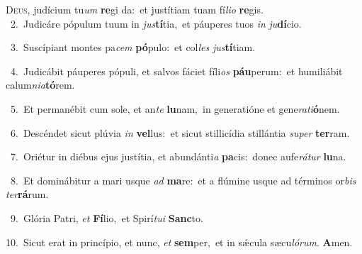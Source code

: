 \lettrine{\initial\textcolor{\initialcolor}{D}}{eus,} judícium tu\textit{um} \textbf{re}\-gi da:~\star et justítiam tuam fí\-\textit{li}\-\textit{o} \textbf{re}\-gis.\\
{\numbfont\textcolor{\numbcolor}{~2.}}~Judicáre pópulum tuum in \textit{jus}\-\textbf{tí}tia,~\star et páuperes tuos \textit{in} \textit{ju}\-\textbf{dí}cio.\par
{\numbfont\textcolor{\numbcolor}{~3.}}~Suscípiant montes pa\textit{cem} \textbf{pó}\-pulo:~\star et col\textit{les} \textit{jus}\-\textbf{tí}tiam.\par
{\numbfont\textcolor{\numbcolor}{~4.}}~Judicábit páuperes pópuli, et salvos fáciet fíli\textit{os} \textbf{páu}\-perum:~\star et humiliábit calum\-\textit{ni}\-\textit{a}\textbf{tó}rem.\par
{\numbfont\textcolor{\numbcolor}{~5.}}~Et permanébit cum sole, et an\textit{te} \textbf{lu}\-nam,~\star in generatióne et gene\-\textit{ra}\-\textit{ti}\textbf{ó}nem.\par
{\numbfont\textcolor{\numbcolor}{~6.}}~Descéndet sicut plúvia \textit{in} \textbf{vel}\-lus:~\star et sicut stillicídia stillántia \textit{su}\-\textit{per} \textbf{ter}\-ram.\par
{\numbfont\textcolor{\numbcolor}{~7.}}~Oriétur in diébus ejus justítia, et abundánti\textit{a} \textbf{pa}\-cis:~\star donec aufe\-\textit{rá}\-\textit{tur} \textbf{lu}\-na.\par
{\numbfont\textcolor{\numbcolor}{~8.}}~Et dominábitur a mari usque \textit{ad} \textbf{ma}\-re:~\star et a flúmine usque ad términos or\textit{bis} \textit{ter}\-\textbf{rá}rum.\par
{\numbfont\textcolor{\numbcolor}{~9.}}~Glória Patri, \textit{et} \textbf{Fí}\-lio,~\star et Spirí\-\textit{tu}\-\textit{i} \textbf{Sanc}\-to.\par
{\numbfont\textcolor{\numbcolor}{10.}}~Sicut erat in princípio, et nunc, \textit{et} \textbf{sem}\-per,~\star et in sǽcula sæcu\-\textit{ló}\-\textit{rum}. \textbf{A}\-men.\par
